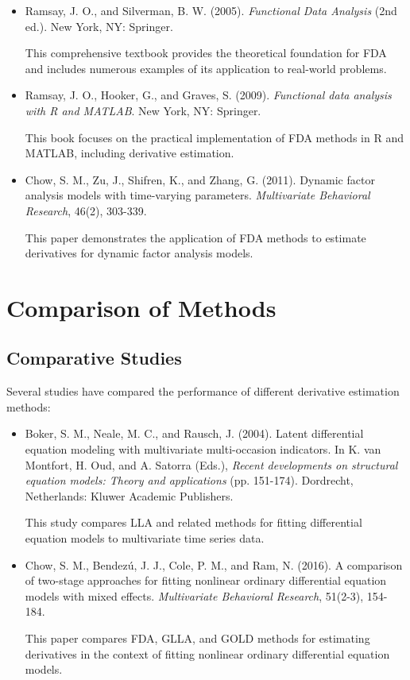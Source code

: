 \documentclass{article}
\begin{document}
\begin{itemize}
    \item Ramsay, J. O., and Silverman, B. W. (2005). \textit{Functional Data Analysis} (2nd ed.). New York, NY: Springer.
    
    This comprehensive textbook provides the theoretical foundation for FDA and includes numerous examples of its application to real-world problems.
    
    \item Ramsay, J. O., Hooker, G., and Graves, S. (2009). \textit{Functional data analysis with R and MATLAB}. New York, NY: Springer.
    
    This book focuses on the practical implementation of FDA methods in R and MATLAB, including derivative estimation.
    
    \item Chow, S. M., Zu, J., Shifren, K., and Zhang, G. (2011). Dynamic factor analysis models with time-varying parameters. \textit{Multivariate Behavioral Research}, 46(2), 303-339.
    
    This paper demonstrates the application of FDA methods to estimate derivatives for dynamic factor analysis models.
\end{itemize}

\section{Comparison of Methods}

\subsection{Comparative Studies}

Several studies have compared the performance of different derivative estimation methods:

\begin{itemize}
    \item Boker, S. M., Neale, M. C., and Rausch, J. (2004). Latent differential equation modeling with multivariate multi-occasion indicators. In K. van Montfort, H. Oud, and A. Satorra (Eds.), \textit{Recent developments on structural equation models: Theory and applications} (pp. 151-174). Dordrecht, Netherlands: Kluwer Academic Publishers.
    
    This study compares LLA and related methods for fitting differential equation models to multivariate time series data.
    
    \item Chow, S. M., Bendezú, J. J., Cole, P. M., and Ram, N. (2016). A comparison of two-stage approaches for fitting nonlinear ordinary differential equation models with mixed effects. \textit{Multivariate Behavioral Research}, 51(2-3), 154-184.
    
    This paper compares FDA, GLLA, and GOLD methods for estimating derivatives in the context of fitting nonlinear ordinary differential equation models.
\end{itemize}
\end{document}
